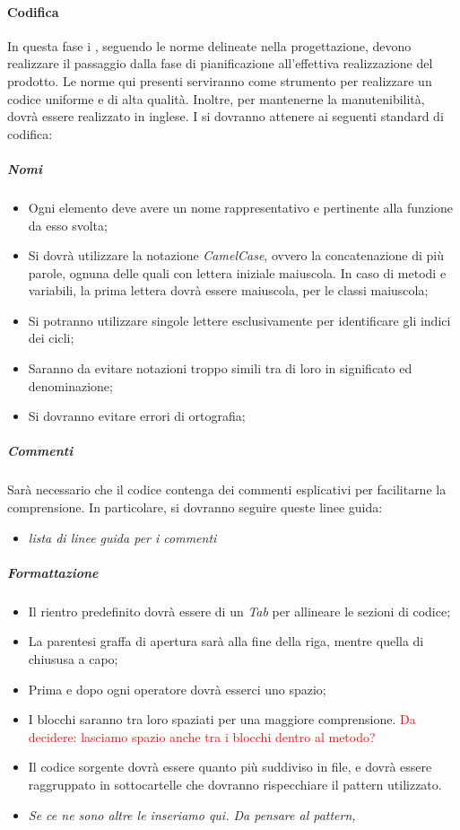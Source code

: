 	\paragraph{Codifica}
	In questa fase i \progrs, seguendo le norme delineate nella progettazione, devono realizzare il passaggio dalla fase di pianificazione all'effettiva realizzazione del prodotto.
	Le norme qui presenti serviranno come strumento per realizzare un codice uniforme e di alta qualità. Inoltre, per mantenerne la manutenibilità, dovrà essere realizzato in inglese.
	I \progrs si dovranno attenere ai seguenti standard di codifica:
	\subparagraph{Nomi}
	\begin{itemize}
		\item Ogni elemento deve avere un nome rappresentativo e pertinente alla funzione da esso svolta;
		\item Si dovrà utilizzare la notazione \emph{CamelCase}, ovvero la concatenazione di più parole, ognuna delle quali con lettera iniziale maiuscola. In caso di metodi e variabili, la prima lettera dovrà essere maiuscola, per le classi maiuscola;
		\item Si potranno utilizzare singole lettere esclusivamente per identificare gli indici dei cicli;
		\item Saranno da evitare notazioni troppo simili tra di loro in significato ed denominazione;
		\item Si dovranno evitare errori di ortografia;
	\end{itemize}
	\subparagraph{Commenti}
	Sarà necessario che il codice contenga dei commenti esplicativi per facilitarne la comprensione. In particolare, si dovranno seguire queste linee guida:
	\begin{itemize}
		\item \textit{lista di linee guida per i commenti}
	\end{itemize}
	\subparagraph{Formattazione}
	\begin{itemize}
		\item Il rientro predefinito dovrà essere di un \emph{Tab} per allineare le sezioni di codice;
		\item La parentesi graffa di apertura sarà alla fine della riga, mentre quella di chiususa a capo;
		\item Prima e dopo ogni operatore dovrà esserci uno spazio;
		\item I blocchi saranno tra loro spaziati per una maggiore comprensione. \textcolor{red}{Da decidere: lasciamo spazio anche tra i blocchi dentro al metodo?}
		\item Il codice sorgente dovrà essere quanto più suddiviso in file, e dovrà essere raggruppato in sottocartelle che dovranno rispecchiare il pattern utilizzato.
		\item \textit{Se ce ne sono altre le inseriamo qui. Da pensare al pattern, }
	\end{itemize}
